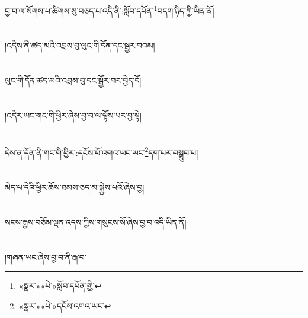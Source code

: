 བྱ་བ་ལ་སོགས་པ་ཚིགས་སུ་བཅད་པ་འདི་ནི་:སློབ་དཔོན་\footnote{«སྣར་»«པེ་»སློབ་དཔོན་གྱི་}བདག་ཉིད་ཀྱི་ཡིན་ནོ།\chapter{ }།འདིས་ནི་ཚད་མའི་འབྲས་བུ་ལུང་གི་དོན་དང་སྦྱར་བའམ།\chapter{ }ལུང་གི་དོན་ཚད་མའི་འབྲས་བུ་དང་སྦྱོར་བར་བྱེད་དོ།\chapter{ }།འདིར་ཡང་གང་གི་ཕྱིར་ཞེས་བྱ་བ་ལ་ལྟོས་པར་བྱ་སྟེ།\chapter{ }དེས་ན་དོན་ནི་གང་གི་ཕྱིར་:དངོས་པོ་འགའ་ཡང་ཡང་\footnote{«སྣར་»«པེ་»དངོས་འགའ་ཡང་}དག་པར་བསྒྲུབ་པ།\chapter{ }མེད་པ་དེའི་ཕྱིར་ཆོས་ཐམས་ཅད་མ་སྐྱེས་པའོ་ཞེས་བྱ།\chapter{ }སངས་རྒྱས་བཅོམ་ལྡན་འདས་ཀྱིས་གསུངས་སོ་ཞེས་བྱ་བ་འདི་ཡིན་ནོ།\chapter{ }།གཞན་ཡང་ཞེས་བྱ་བ་ནི་རྒ་བ་